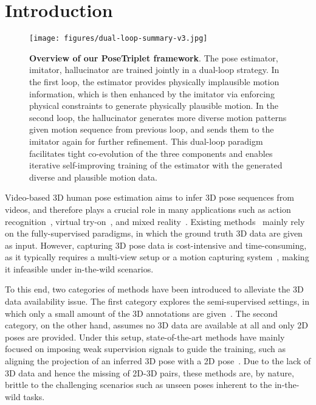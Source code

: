 \documentclass[10pt,twocolumn,letterpaper]{article}
\newcommand{\nameofmethod}{PoseTriplet}
\begin{document}
\section{Introduction}
\label{sec:intro}


\begin{figure}[!t]
\centering
\texttt{[image: figures/dual-loop-summary-v3.jpg]}
\caption{\textbf{Overview of our \nameofmethod{} framework}. {The pose estimator, imitator, hallucinator are trained jointly in a dual-loop strategy. In the first loop, the estimator provides physically implausible motion information, which is then enhanced by the imitator via enforcing physical constraints to generate physically plausible motion. In the second loop, the hallucinator generates more diverse motion patterns given motion sequence from previous loop, and sends them to the imitator again for further refinement. This dual-loop paradigm facilitates tight co-evolution of the three components and enables iterative self-improving training of the estimator with the generated diverse and plausible motion data.}}
\vspace{-7mm}
\label{fig:summary}
\end{figure}


Video-based 3D human pose estimation 
aims to infer  3D pose sequences from videos,
and therefore plays a crucial role in many applications
such as action recognition~\cite{yan2018spatial,si2019attention}, virtual try-on~\cite{liu2021spatt}, and mixed reality~\cite{mehta2017vnect, joo2020exemplar,chengpnerf}.
Existing methods~\cite{martinez2017simple,sun2018integral,nie2019spm,kocabas2020vibe,pavllo2019videopose3d} mainly rely on 
the fully-supervised paradigms, 
in which the ground truth 3D data are given
as input. However, capturing 3D pose data 
is cost-intensive and time-consuming,
as it typically requires a multi-view 
setup or a  motion capturing system~\cite{mehta2017vnect, ionescu2014human3},
making it infeasible under in-the-wild scenarios.

To this end, two categories of methods have been introduced
to alleviate the 3D data availability issue.
The first category explores the 
semi-supervised settings, in which only a small amount
of the 3D annotations are given~\cite{zhou2017towards, li2019boosting, mitra2020multiview}.
The second category, on the other hand,
assumes no 3D data are available at all
and only 2D poses are provided.
Under this setup, 
state-of-the-art methods 
have mainly focused on imposing
weak supervision signals to guide the training,
such as aligning the projection
of an inferred 3D pose with a 2D pose~\cite{chen2019unsupervised, yu2021towards, hu2021unsupervised}.
Due to the lack of 3D data and hence
the missing of  2D-3D pairs, 
these methods are, by nature,
brittle to the challenging scenarios such as unseen poses
inherent to the in-the-wild tasks.
\end{document}
